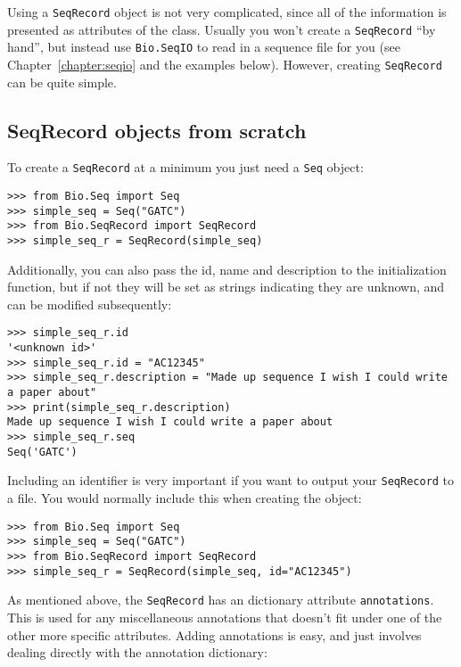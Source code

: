 Using a \verb|SeqRecord| object is not very complicated, since all of the
information is presented as attributes of the class. Usually you won't create
a \verb|SeqRecord| ``by hand'', but instead use \verb|Bio.SeqIO| to read in a
sequence file for you (see Chapter~\ref{chapter:seqio} and the examples
below).  However, creating \verb|SeqRecord| can be quite simple.

\subsection{SeqRecord objects from scratch}

To create a \verb|SeqRecord| at a minimum you just need a \verb|Seq| object:

\begin{verbatim}
>>> from Bio.Seq import Seq
>>> simple_seq = Seq("GATC")
>>> from Bio.SeqRecord import SeqRecord
>>> simple_seq_r = SeqRecord(simple_seq)
\end{verbatim}

Additionally, you can also pass the id, name and description to the initialization function, but if not they will be set as strings indicating they are unknown, and can be modified subsequently:

\begin{verbatim}
>>> simple_seq_r.id
'<unknown id>'
>>> simple_seq_r.id = "AC12345"
>>> simple_seq_r.description = "Made up sequence I wish I could write a paper about"
>>> print(simple_seq_r.description)
Made up sequence I wish I could write a paper about
>>> simple_seq_r.seq
Seq('GATC')
\end{verbatim}

Including an identifier is very important if you want to output your \verb|SeqRecord| to a file.  You would normally include this when creating the object:

\begin{verbatim}
>>> from Bio.Seq import Seq
>>> simple_seq = Seq("GATC")
>>> from Bio.SeqRecord import SeqRecord
>>> simple_seq_r = SeqRecord(simple_seq, id="AC12345")
\end{verbatim}

As mentioned above, the \verb|SeqRecord| has an dictionary attribute \verb|annotations|. This is used
for any miscellaneous annotations that doesn't fit under one of the other more specific attributes.
Adding annotations is easy, and just involves dealing directly with the annotation dictionary:

